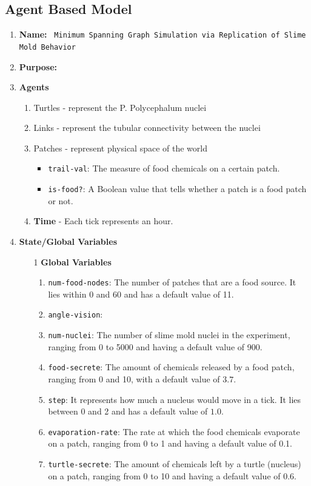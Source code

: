 \documentclass[a4paper, 11pt]{article}
\begin{document}
\subsection{Agent Based Model}
    
\begin{enumerate}
    \item \textbf{Name: }\texttt{ Minimum Spanning Graph Simulation via Replication of Slime Mold Behavior}
    \item \textbf{Purpose:} 
    \item \textbf{Agents}\par
    \begin{enumerate}
        \item Turtles - represent the P. Polycephalum nuclei
        \item Links - represent the tubular connectivity between the nuclei
        \item Patches - represent physical space of the world 
            \begin{itemize}
                \item \texttt{trail-val}: The measure of food chemicals on a certain patch.
                \item \texttt{is-food?}: A Boolean value that tells whether a patch is a food patch or not.
            \end{itemize}
        \item \textbf{Time} - Each tick represents an hour.
    \end{enumerate}
    \item \textbf{State/Global Variables}
    \begin{itemize}
        \item[1] \textbf{Global Variables}
        \begin{enumerate}
            \item \texttt{num-food-nodes}: The number of patches that are a food source. It lies within 0 and 60 and has a default value of 11. 
            \item \texttt{angle-vision}:
            \item \texttt{num-nuclei}: The number of slime mold nuclei in the experiment, ranging from 0 to 5000 and having a default value of 900.
            \item \texttt{food-secrete}: The amount of chemicals released by a food patch, ranging from 0 and 10, with a default value of $3.7$.
            \item \texttt{step}: It represents how much a nucleus would move in a tick. It lies between 0 and 2 and has a default value of $1.0$.
            \item \texttt{evaporation-rate}: The rate at which the food chemicals evaporate on a patch, ranging from 0 to 1 and having a default value of 0.1. 
            \item \texttt{turtle-secrete}: The amount of chemicals left by a turtle (nucleus) on a patch, ranging from 0 to 10 and having a default value of 0.6. 
        \end{enumerate} 
    \end{itemize}


\end{enumerate}
\end{document}
